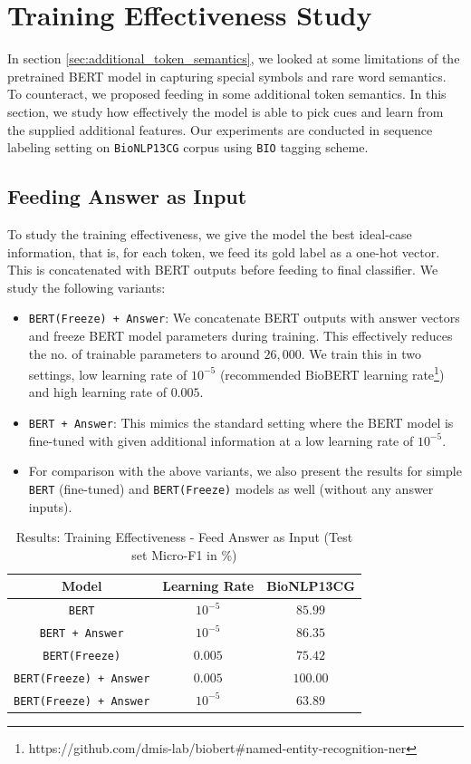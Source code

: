 \section{Training Effectiveness Study}
In section \ref{sec:additional_token_semantics}, we looked at some limitations of the pretrained BERT model in capturing special symbols and rare word semantics. To counteract, we proposed feeding in some additional token semantics. In this section, we study how effectively the model is able to pick cues and learn from the supplied additional features. Our experiments are conducted in sequence labeling setting on \texttt{BioNLP13CG} corpus using \texttt{BIO} tagging scheme.

\subsection{Feeding Answer as Input}
To study the training effectiveness, we give the model the best ideal-case information, that is, for each token, we feed its gold label as a one-hot vector. This is concatenated with BERT outputs before feeding to final classifier. We study the following variants:

\begin{itemize}
    \item \texttt{BERT(Freeze) + Answer}: We concatenate BERT outputs with answer vectors and freeze BERT model parameters during training. This effectively reduces the no. of trainable parameters to around $26,000$. We train this in two settings, low learning rate of $10^{-5}$ (recommended BioBERT learning rate\footnote{https://github.com/dmis-lab/biobert\#named-entity-recognition-ner}) and high learning rate of $0.005$.
    
    \item \texttt{BERT + Answer}: This mimics the standard setting where the BERT model is fine-tuned with given additional information at a low learning rate of $10^{-5}$.
    
    \item For comparison with the above variants, we also present the results for simple \texttt{BERT} (fine-tuned) and \texttt{BERT(Freeze)} models as well (without any answer inputs).
\end{itemize}

\begin{table}[h!]
\centering
\begin{tabular}{|c|c|c|}\hline
	\textbf{Model} & \textbf{Learning Rate} & \textbf{BioNLP13CG}\\\hline
	\texttt{BERT} & $10^{-5}$ & $85.99$\\\hline
	\texttt{BERT + Answer} & $10^{-5}$ & $86.35$\\\hline
	\texttt{BERT(Freeze)} & $0.005$ & $75.42$\\\hline
	\texttt{BERT(Freeze) + Answer} & $0.005$ & $100.00$\\\hline
	\texttt{BERT(Freeze) + Answer} & $10^{-5}$ & $63.89$\\\hline
	\end{tabular}
    \caption{Results: Training Effectiveness - Feed Answer as Input (Test set Micro-F1 in \%)}
    \label{tab:res_training_ans_input}
\end{table}

